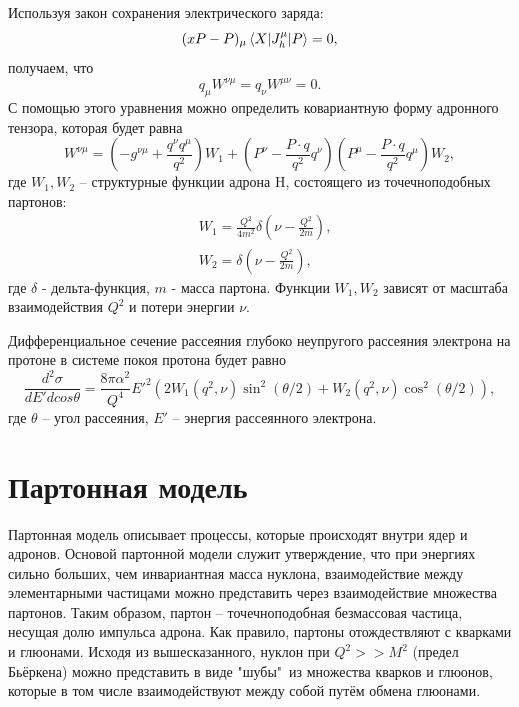 \documentclass{extarticle}
\begin{document}
Используя закон сохранения электрического заряда:
\begin{equation}
	(xP-P)_\mu \braket{X | J_h^\mu | P} = 0,
\end{equation}
получаем, что 
\begin{equation}
	q_\mu W^{\nu \mu} = q_\nu W^{\mu \nu} = 0. 
\end{equation}
С помощью этого уравнения можно определить ковариантную форму адронного тензора, которая будет равна
\begin{equation}
	W^{\nu \mu} = (-g^{\nu\mu}+ \frac{q^\nu q^\mu}{q^2})W_1 + (P^\nu - \frac{P\cdot q}{q^2}q^\nu)(P^\mu - \frac{P\cdot q}{q^2} q^\mu) W_2,
\end{equation}
где $W_1, W_2$ -- структурные функции адрона H, состоящего из точечноподобных партонов:
\begin{equation}
\begin{split}
	& W_1  =   \frac{Q^2}{4m^2} \delta(\nu - \frac{Q^2}{2m}), \\
	& W_2  =  \delta(\nu - \frac{Q^2}{2m}),
\end{split}
	\label{eq:deltastruct}
\end{equation}
где $\delta$ - дельта-функция, $m$ - масса партона. Функции $W_1, W_2$ зависят от масштаба взаимодействия $Q^2$ и потери энергии $\nu$.

Дифференциальное сечение рассеяния глубоко неупругого рассеяния электрона на протоне в системе покоя протона будет равно
\begin{equation}
	\frac{d^2\sigma}{dE' d cos\theta} = \frac{8\pi \alpha^2}{Q^4} E'^2 (2W_1(q^2, \nu) \sin^2 (\theta /2) + W_2 (q^2, \nu) \cos^2 (\theta/2)),
\end{equation}
где $\theta$ -- угол рассеяния, $E'$ -- энергия рассеянного электрона.
\newpage
\section{Партонная модель}
Партонная модель описывает процессы, которые происходят внутри ядер и адронов. Основой партонной модели служит утверждение, что при энергиях сильно больших, чем инвариантная масса нуклона, взаимодействие между элементарными частицами можно представить через взаимодействие множества партонов. Таким образом, партон -- точечноподобная безмассовая частица, несущая долю импульса адрона. Как правило, партоны отождествляют с кварками и глюонами. 
Исходя из вышесказанного, нуклон при $Q^2 >> M^2$ (предел Бьёркена) можно представить в виде "шубы"\ из множества кварков и глюонов, которые в том числе взаимодействуют между собой путём обмена глюонами.
\end{document}
